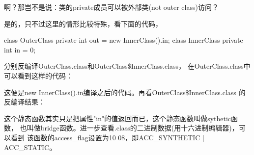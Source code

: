 啊？那岂不是说：类的private成员可以被外部类(not outer class)访问？

是的，只不过这里的情形比较特殊，看下面的代码，

\begin{javacode}
class OuterClass {
  private int out = new InnerClass().in;
  class InnerClass {
    private int in = 0;
  }
}
\end{javacode}

分别反编译OuterClass.class和OuterClass\$InnerClass.class，
在OuterClass.class中可以看到这样的代码：


这便是new InnerClass().in编译之后的代码。再看OuterClass\$InnerClass.class
的反编译结果：


这个静态函数其实只是把属性"in"的值返回而已，这个静态函数叫做sythetic函数，
也叫做bridge函数。进一步查看.class的二进制数据(用十六进制编辑器)，可以看到
该函数的access\_flag设置为10 08，即ACC\_SYNTHETIC | ACC\_STATIC。
